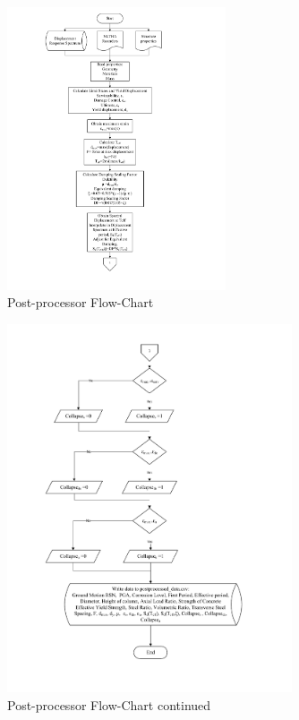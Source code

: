 \begin{figure}[htp]
	\centering
	\includegraphics[width=0.575\textwidth]{VAC Thesis 2.0/Chapter-5/figs/PostProcessor_FlowCharts_01.pdf}
	\caption{Post-processor Flow-Chart}
	\label{fig:postproc_flowchart_01}
\end{figure}

\begin{figure}[htp]
	\centering
	\includegraphics[width=0.75\textwidth]{VAC Thesis 2.0/Chapter-5/figs/PostProcessor_FlowCharts_02.pdf}
	\caption{Post-processor Flow-Chart continued}
	\label{fig:postproc_flowchart_02}
\end{figure}




